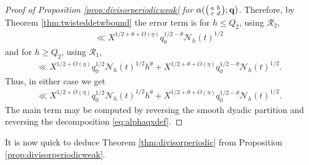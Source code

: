 \documentclass[12pt]{amsart}
\theoremstyle{definition}
\theoremstyle{remark}
\numberwithin{equation}{section}
\newcommand{\1}{{\mathbf 1}}
\renewcommand{\c}{\mathfrak c}
\begin{document}
\begin{proof}[Proof of Proposition \ref{prop:divisorperiodicweak} for $ \alpha(\smqty(a & b \\c & d);\mathbf{q})$]
Therefore, by Theorem \ref{thm:twisteddetwbound} the error term is for $h \leq  Q_2$, using $\mathcal{R}_2$,
\begin{align*}
 \ll  X^{1/2+\theta+O(\eta)}  q_0^{1/2-\theta}\mathcal{N}_h(t)^{1/2}  
\end{align*}
and for $h \geq  Q_2$, using $\mathcal{R}_1$,
\begin{align*}
\ll  X^{1/2 +O(\eta)}  q_0^{1/2} \mathcal{N}_h(t)^{1/2}  h^{\theta} + X^{1/2+\theta +O(\eta)}  q_0^{1/2-\theta} \mathcal{N}_h(t)^{1/2}.
\end{align*}
Thus, in either case we get
\begin{align*}
    \ll  X^{1/2+O(\eta)}  q_0^{1/2}\mathcal{N}_h(t)^{1/2}   h^{\theta}  + X^{1/2+\theta+O(\eta)}  q_0^{1/2-\theta}\mathcal{N}_h(t)^{1/2}.
\end{align*}
The main term may be computed by reversing the smooth  dyadic partition and reversing the decomposition \eqref{eq:alphaqxdef}.
\end{proof}
It is now quick to deduce Theorem \ref{thm:divisorperiodic} from Proposition \ref{prop:divisorperiodicweak}.
\end{document}
